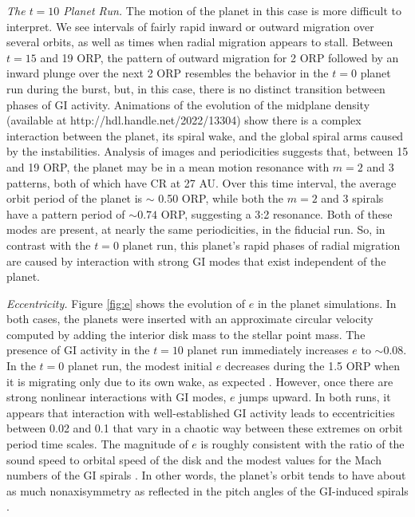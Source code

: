 \documentclass[12pt,manuscript,authoryear]{aastex}
\begin{document}
{\it The $t = 10$ Planet Run.} The motion of the planet in this case is more difficult to interpret. We see intervals of
fairly rapid inward or outward migration over several orbits, as well as times when radial migration appears to
stall. Between $t = 15$ and 19 ORP, the pattern of outward migration for 2 ORP followed by an inward plunge over the
next 2 ORP resembles the behavior in the $t = 0$ planet run during the burst, but, in this case, there is no distinct
transition between phases of GI activity. Animations of the evolution of the midplane density (available at
http://hdl.handle.net/2022/13304) show there is a complex interaction between the planet, its spiral wake, and the
global spiral arms caused by the instabilities. Analysis of images and periodicities suggests that, between 15 and 19
ORP, the planet may be in a mean motion resonance with $m = 2$ and 3 patterns, both of which have CR at 27 AU. Over this
time interval, the average orbit period of the planet is $\sim$ 0.50 ORP, while both the $m = 2$ and 3 spirals have a
pattern period of $\sim 0.74$ ORP, suggesting a 3:2 resonance. Both of these modes are present, at nearly the same
periodicities, in the fiducial run. So, in contrast with the $t = 0$ planet run, this planet's rapid phases of radial
migration are caused by interaction with strong GI modes that exist independent of the planet.

{\it Eccentricity.} Figure \ref{fig:e} shows the evolution of $e$ in the planet simulations. In both cases, the planets
were inserted with an approximate circular velocity computed by adding the interior disk mass to the stellar point
mass. The presence of GI activity in the $t = 10$ planet run immediately increases $e$ to $\sim 0.08$. In the $t = 0$
planet run, the modest initial $e$ decreases during the 1.5 ORP when it is migrating only due to its own wake, as
expected \citep{ward1998,ward2003,goldreich2004}.  However, once there are strong nonlinear interactions with GI modes,
$e$ jumps upward. In both runs, it appears that interaction with well-established GI activity leads to eccentricities
between 0.02 and 0.1 that vary in a chaotic way between these extremes on orbit period time scales. The magnitude of $e$
is roughly consistent with the ratio of the sound speed to orbital speed of the disk and the modest values for the Mach
numbers of the GI spirals \citep{boley2006a,boley2008}. In other words, the planet's orbit tends to have about as much
nonaxisymmetry as reflected in the pitch angles of the GI-induced spirals \citep{cossins2009}.
\end{document}

